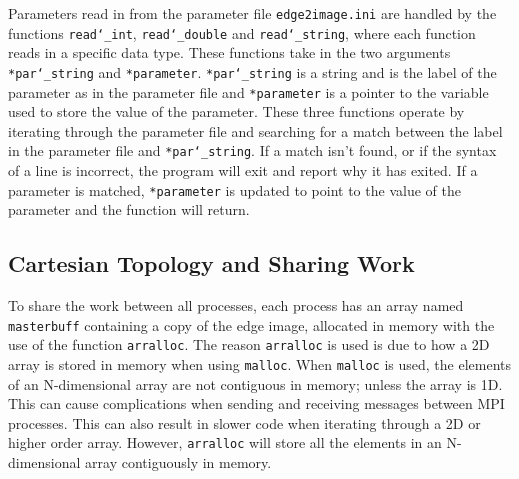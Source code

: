 \documentclass[11pt, a4paper]{article}
\begin{document}
			Parameters read in from the parameter file \texttt{edge2image.ini} are handled by the functions \texttt{read\char`_int}, \texttt{read\char`_double} and \texttt{read\char`_string}, where each function reads in a specific data type. These functions take in the two arguments \texttt{*par\char`_string} and \texttt{*parameter}. \texttt{*par\char`_string} is a string and is the label of the parameter as in the parameter file and \texttt{*parameter} is a pointer to the variable used to store the value of the parameter. These three functions operate by iterating through the parameter file and searching for a match between the label in the parameter file and \texttt{*par\char`_string}. If a match isn't found, or if the syntax of a line is incorrect, the program will exit and report why it has exited. If a parameter is matched, \texttt{*parameter} is updated to point to the value of the parameter and the function will return.
			
	
		\subsection{Cartesian Topology and Sharing Work} \label{sect:deconstruct}
			To share the work between all processes, each process has an array named \texttt{masterbuff} containing a copy of the edge image, allocated in memory with the use of the function \texttt{arralloc}. The reason \texttt{arralloc} is used is due to how a 2D array is stored in memory when using \texttt{malloc}. When \texttt{malloc} is used, the elements of an N-dimensional array are not contiguous in memory; unless the array is 1D. This can cause complications when sending and receiving messages between MPI processes. This can also result in slower code when iterating through a 2D or higher order array. However, \texttt{arralloc} will store all the elements in an N-dimensional array contiguously in memory.
			
\end{document}
